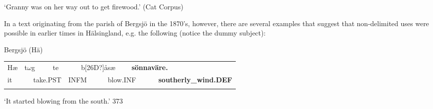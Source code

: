 \begin{styleTranslation}
‘Granny was on her way out to get firewood.’ (Cat Corpus)

\end{styleTranslation}

\begin{styleBodyTextFirst}
In a text originating from the parish of Bergsjö in the 1870’s, however, there are several examples that suggest that non-delimited uses were possible in earlier times in Hälsingland, e.g. the following (notice the dummy subject):

\end{styleBodyTextFirst}

\begin{listWWNumileveli}
\item 

\begin{styleExample}
\label{bkm:Ref154221800}Bergsjö (Hä)

\end{styleExample}

\end{listWWNumileveli}

\begin{listWWNumxxxiiileveli}
\item 

\end{listWWNumxxxiiileveli}

\begin{tabular}{llllllllll}
\lsptoprule
Hæ & \multicolumn{2}{l}{t$\omega $g

} & \multicolumn{2}{l}{te

} & \multicolumn{2}{l}{b[26D?]åsæ

} & \multicolumn{2}{l}{{\bfseries sönnaväre.}

} & \\
\multicolumn{2}{l}{it

} & \multicolumn{2}{l}{take.PST

} & \multicolumn{2}{l}{INFM

} & \multicolumn{2}{l}{blow.INF

} & \multicolumn{2}{l}{{\bfseries southerly\_wind.DEF}

}\\
\lspbottomrule
\end{tabular}

\begin{styleTranslation}
‘It started blowing from the south.’ 373

\end{styleTranslation}

